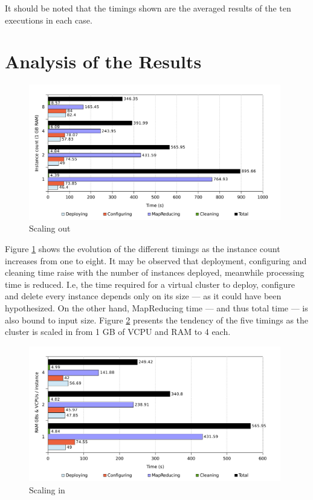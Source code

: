 It should be noted that the timings shown are the averaged results of the ten executions in each case.

\section{Analysis of the Results}\label{sec:analisisresultados}

\begin{figure}[tbp]
\begin{center}
\includegraphics[width=0.98\textwidth]{imagenes/039.pdf}
\caption{Scaling out}
\label{fig:eschorizontal}
\end{center}
\end{figure}

\noindent Figure \ref{fig:eschorizontal} shows the evolution of the different timings as the instance count increases from one to eight. It may be observed that deployment, configuring and cleaning time raise with the number of instances deployed, meanwhile processing time is reduced. I.e, the time required for a virtual cluster to deploy, configure and delete every instance depends only on its size --- as it could have been hypothesized. On the other hand, MapReducing time --- and thus total time --- is also bound to input size. Figure \ref{fig:escvertical} presents the tendency of the five timings as the cluster is scaled in from 1 GB of VCPU and RAM to 4 each.

\begin{figure}[tbp]
\begin{center}
\includegraphics[width=0.98\textwidth]{imagenes/041.pdf}
\caption{Scaling in}
\label{fig:escvertical}
\end{center}
\end{figure}



